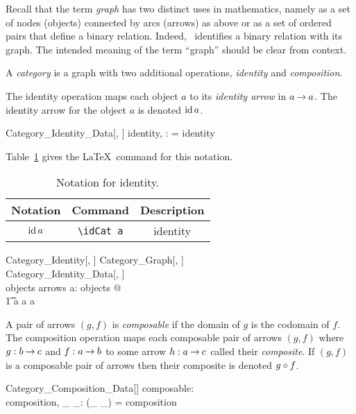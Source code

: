 \documentclass{amsart}
\begin{document}
Recall that the term \textit{graph} has two distinct uses in mathematics, 
namely as a set of nodes (objects) connected by arcs (arrows) as above or
as a set of ordered pairs that define a binary relation.
Indeed, \ZN\ identifies a binary relation with its graph.
The intended meaning of the term ``graph'' should be clear from context.

A \textit{category} is a graph with two additional operations, \textit{identity} and \textit{composition}.

The identity operation maps each object $a$ to its \textit{identity arrow} in $a \mathbin{\rightarrow} a$.
The identity arrow for the object $a$ is denoted $\operatorname{id} a$.
\begin{schema}{Category\_Identity\_Data}[\genO, \genA]
	identity, \idCat: \genO \rel \genA
\where
	\idCat = identity
\end{schema}

Table~\ref{table:category_identity_notation} gives the \LaTeX\ command for this notation.

\begin{table}[h!]
\centering
\begin{tabular}{|c|c|c|}
\hline
Notation		& Command		& Description \\
\hline
$\operatorname{id} a$		&\verb|\idCat a|		& identity \\
\hline
\end{tabular}
\vspace{1ex}
\caption{Notation for identity.}
\label{table:category_identity_notation}
\end{table}

\begin{schema}{Category\_Identity}[\genO, \genA]
	Category\_Graph[\genO, \genA] \\
	Category\_Identity\_Data[\genO, \genA] \\
\where
	\idCat \in objects \fun arrows
\also
	\forall a: objects @ \\
	\t1	\idCat a \in a \arrCat a
\end{schema}

A pair of arrows $(g, f)$ is \textit{composable} if the domain of $g$ is the codomain of $f$.
The composition operation maps each composable pair of arrows $(g, f)$ where $g: b \mathbin{\rightarrow} c$ and $f: a \mathbin{\rightarrow} b$ to some arrow $h: a \mathbin{\rightarrow} c$
called their \textit{composite}.
If $(g, f)$ is a composable pair of arrows then their composite is denoted $g \mathbin{\circ} f$.
\begin{schema}{Category\_Composition\_Data}[\genA]
	composable: \genA \rel \genA \\
	composition, \_ \compCat \_: \genA \cross \genA \rel \genA
\where
	(\_ \compCat \_) = composition
\end{schema}
\end{document}
